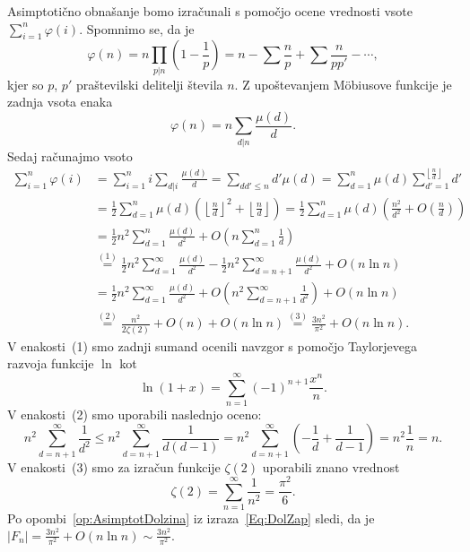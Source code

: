 \documentclass[mat1]{fmfdelo}
\begin{document}
\begin{dokaz}
Asimptotično obnašanje bomo izračunali s pomočjo ocene vrednosti vsote \( \sum_{i=1}^n \varphi(i) \).
Spomnimo se, da je 
\[ \varphi(n) = n \prod_{p|n} \left (1 - \frac{1}{p} \right ) = n - \sum \frac{n}{p} + \sum \frac{n}{pp'} - \cdots , \]
kjer so $p$, $p'$ praštevilski delitelji števila $n$.  Z upoštevanjem M\"obiusove funkcije je zadnja vsota enaka
\[ \varphi(n) = n \sum_{d|n} \frac{\mu(d)}{d} .\]
Sedaj računajmo vsoto 
%
\begin{align}
\label{Eq:DolZap}
\sum_{i=1}^n \varphi(i)
  &= \sum_{i=1}^n i \sum_{d|i} \frac{\mu(d)}{d} = \sum_{dd'\leq n}d' \mu(d) = 
    \sum_{d=1}^n \mu(d) \sum_{d'=1}^{\left \lfloor \frac{n}{d} \right \rfloor} d' \nonumber \\
  &= \frac{1}{2} \sum_{d=1}^{n} \mu(d) \left (\left \lfloor \frac{n}{d} \right \rfloor ^2 + \left \lfloor \frac{n}{d} \right \rfloor \right) =
    \frac{1}{2} \sum_{d=1}^{n} \mu(d) \left (\frac{n^2}{d^2} + O \left (\frac{n}{d} \right) \right) \nonumber \\
  &= \frac{1}{2}n^2 \sum_{d=1}^{n} \frac{\mu(d)}{d^2} + O \left (n \sum_{d=1}^{n} \frac{1}{d} \right ) \nonumber \\
  &\stackrel{(1)}{=} \frac{1}{2}n^2 \sum_{d=1}^{\infty} \frac{\mu(d)}{d^2} - \frac{1}{2}n^2 \sum_{d=n+1}^{\infty} \frac{\mu(d)}{d^2} + O(n \ln{n}) \nonumber \\
  &= \frac{1}{2}n^2 \sum_{d=1}^{\infty} \frac{\mu(d)}{d^2} + O \left (n^2\sum_{d=n+1}^{\infty} \frac{1}{d^2} \right ) + O(n \ln{n}) \nonumber \\
  & \stackrel{(2)}{=} \frac{n^2}{2 \zeta(2)} + O(n) + O(n \ln{n}) \stackrel{(3)}{=} \frac{3n^2}{\pi^2} + O(n \ln{n}).
\end{align}
%
V enakosti~(1) smo zadnji sumand ocenili navzgor s pomočjo Taylorjevega razvoja funkcije $\ln$ kot
\[ \ln{(1+x)} = \sum_{n=1}^{\infty} (-1)^{n+1} \frac{x^n}{n}.\]
%
V enakosti~(2) smo uporabili naslednjo oceno:
\[ n^2 \sum_{d=n+1}^{\infty} \frac{1}{d^2} \leq n^2 \sum_{d=n+1}^{\infty} \frac{1}{d(d-1)} = 
n^2 \sum_{d=n+1}^{\infty} \left (- \frac{1}{d} + \frac{1}{d-1} \right ) = n^2 \frac{1}{n} = n.\]
%
V enakosti~(3) smo za izračun funkcije $\zeta(2)$ uporabili znano vrednost
\[ \zeta(2) = \sum_{n=1}^{\infty} \frac{1}{n^2} = \frac{\pi^2}{6}.\]
%
Po opombi~\ref{op:AsimptotDolzina} iz izraza~\eqref{Eq:DolZap} sledi, da je \(|F_n| = \frac{3n^2}{\pi^2} + O(n \ln{n}) \sim\frac{3n^2}{\pi^2}. \)
\end{dokaz}

%
\end{document}
